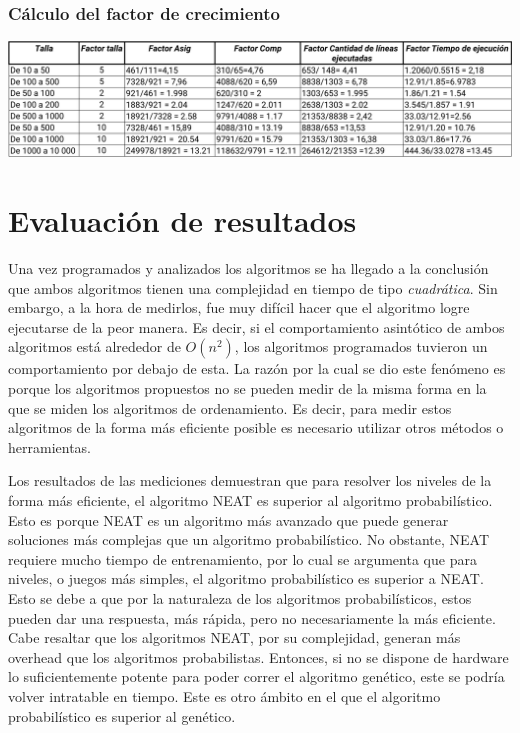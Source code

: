 \documentclass{article}
\begin{document}
\subsubsection{Cálculo del factor de crecimiento}
\begin{center}
  \includegraphics[scale=0.25]{prob/fac-crec.png}
\end{center}
\newpage
\section{Evaluación de resultados}
Una vez programados y analizados los algoritmos se ha llegado a la conclusión que ambos algoritmos tienen una complejidad en tiempo de tipo \textit{cuadrática}. Sin embargo, a la hora de medirlos, fue muy difícil hacer que el algoritmo logre ejecutarse de la peor manera. Es decir, si el comportamiento asintótico de ambos algoritmos está alrededor de \(O(n^{2})\), los algoritmos programados tuvieron un comportamiento por debajo de esta. La razón por la cual se dio este fenómeno es porque los algoritmos propuestos no se pueden medir de la misma forma en la que se miden los algoritmos de ordenamiento. Es decir, para medir estos algoritmos de la forma más eficiente posible es necesario utilizar otros métodos o herramientas.

Los resultados de las mediciones demuestran que para resolver los niveles de la forma más eficiente, el algoritmo NEAT es superior al algoritmo probabilístico. Esto es porque NEAT es un algoritmo más avanzado que puede generar soluciones más complejas que un algoritmo probabilístico. No obstante, NEAT requiere mucho tiempo de entrenamiento, por lo cual se argumenta que para niveles, o juegos más simples, el algoritmo probabilístico es superior a NEAT. Esto se debe a que por la naturaleza de los algoritmos probabilísticos, estos pueden dar una respuesta, más rápida, pero no necesariamente la más eficiente. Cabe resaltar que los algoritmos NEAT, por su complejidad, generan más overhead que los algoritmos probabilistas. Entonces, si no se dispone de hardware lo suficientemente potente para poder correr el algoritmo genético, este se podría volver intratable en tiempo. Este es otro ámbito en el que el algoritmo probabilístico es superior al genético.
\end{document}
